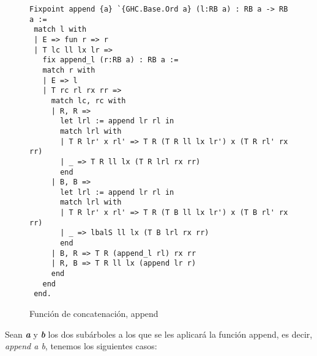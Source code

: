 \begin{figure}
\centering
\captionsetup{justification=centering}
\begin{verbatim}
Fixpoint append {a} `{GHC.Base.Ord a} (l:RB a) : RB a -> RB a :=
 match l with
 | E => fun r => r
 | T lc ll lx lr =>
   fix append_l (r:RB a) : RB a :=
   match r with
   | E => l
   | T rc rl rx rr =>
     match lc, rc with
     | R, R =>
       let lrl := append lr rl in
       match lrl with
       | T R lr' x rl' => T R (T R ll lx lr') x (T R rl' rx rr)
       | _ => T R ll lx (T R lrl rx rr)
       end
     | B, B =>
       let lrl := append lr rl in
       match lrl with
       | T R lr' x rl' => T R (T B ll lx lr') x (T B rl' rx rr)
       | _ => lbalS ll lx (T B lrl rx rr)
       end
     | B, R => T R (append_l rl) rx rr
     | R, B => T R ll lx (append lr r)
     end
   end
 end.
\end{verbatim}
\caption{Funci\'on de concatenaci\'on, append}
\label{func_app}
\end{figure}


Sean \textbf{\textit{a}} y \textbf{\textit{b}} los dos subárboles a los que se les aplicar\'a la 
funci\'on append, es decir, \textit{append a b}, tenemos los siguientes casos:

